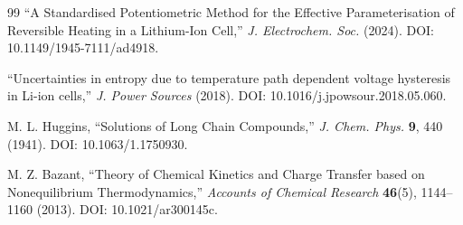 \documentclass[11pt,a4paper]{article}
\begin{document}
\begin{thebibliography}{99}
``A Standardised Potentiometric Method for the Effective Parameterisation of
Reversible Heating in a Lithium-Ion Cell,''
\emph{J. Electrochem. Soc.} (2024).
DOI: 10.1149/1945-7111/ad4918.

``Uncertainties in entropy due to temperature path dependent voltage hysteresis in
Li-ion cells,''
\emph{J. Power Sources} (2018).
DOI: 10.1016/j.jpowsour.2018.05.060.

M. L. Huggins,
``Solutions of Long Chain Compounds,''
\emph{J. Chem. Phys.} \textbf{9}, 440 (1941).
DOI: 10.1063/1.1750930.

M. Z. Bazant,
``Theory of Chemical Kinetics and Charge Transfer based on Nonequilibrium Thermodynamics,''
\emph{Accounts of Chemical Research} \textbf{46}(5), 1144--1160 (2013).
DOI: 10.1021/ar300145c.
\end{thebibliography}
\end{document}
